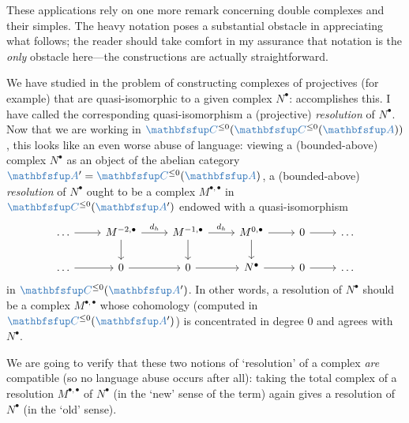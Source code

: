 These applications rely on one more remark concerning double complexes
and their simples. The heavy notation poses a substantial obstacle in
appreciating what follows; the reader should take comfort in my
assurance that notation is the \emph{only} obstacle here---the
constructions are actually straightforward.

We have studied in 
the problem of constructing complexes of projectives (for example)
that are quasi-isomorphic to a given complex $N^\bullet$:
 accomplishes this. I have called the
corresponding quasi-isomorphism a (projective) \emph{resolution} of
$N^\bullet$. Now that we are working in
$\categ{C}^{\le 0}(\categ{C}^{\le 0}(\categ{A}))$, this looks like an
even worse abuse of language: viewing a (bounded-above) complex
$N^\bullet$ as an object of the abelian category
$\categ{A}' = \categ{C}^{\le 0}(\categ{A})$, a (bounded-above)
\emph{resolution} of $N^\bullet$ ought to be a complex
$M^{\bullet,\bullet}$ in $\categ{C}^{\le 0}(\categ{A}')$ endowed with
a quasi-isomorphism
\[\begin{tikzcd}
    \dots \arrow[r] & M^{-2,\bullet} \arrow[r, "d_h"] \arrow[d] &
    M^{-1,\bullet} \arrow[r, "d_h"] \arrow[d] & M^{0,\bullet}
    \arrow[r]
    \arrow[d] & 0 \arrow[r] & \dots \\
    \dots \arrow[r] & 0 \arrow[r] & 0 \arrow[r] & N^\bullet \arrow[r]
    & 0 \arrow[r] & \dots
  \end{tikzcd}\] in $\categ{C}^{\le 0}(\categ{A}')$. In other words, a
resolution of $N^\bullet$ should be a complex $M^{\bullet,\bullet}$
whose cohomology (computed in $\categ{C}^{\le 0}(\categ{A}')$) is
concentrated in degree $0$ and agrees with $N^\bullet$.

We are going to verify that these two notions of `resolution' of a
complex \emph{are} compatible (so no language abuse occurs after all):
taking the total complex of a resolution $M^{\bullet,\bullet}$ of
$N^\bullet$ (in the `new' sense of the term) again gives a resolution
of $N^\bullet$ (in the `old' sense).

